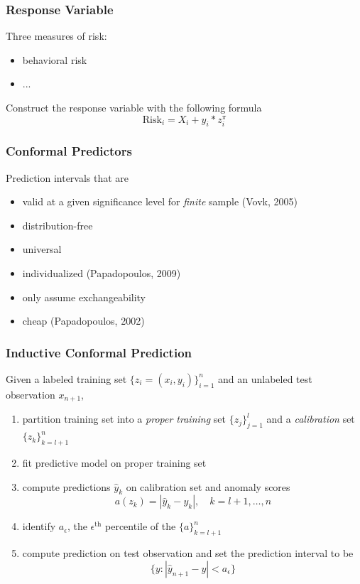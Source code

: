 \documentclass{beamer}
\begin{document}
\begin{frame} \frametitle{Response Variable}

Three measures of risk:
\begin{itemize}
	\item behavioral risk
	\item ...
\end{itemize}

Construct the response variable with the following formula
$$\text{Risk}_i = X_i + y_i * z_i ^ \pi$$

\end{frame}


\begin{frame} \frametitle{Conformal Predictors}

Prediction intervals that are
\begin{itemize}
	\item valid at a given significance level for \textit{finite} sample (Vovk, 2005)
	\item distribution-free
	\item universal
	\item individualized (Papadopoulos, 2009)
	\item only assume exchangeability
	\item cheap (Papadopoulos, 2002)
\end{itemize}
\end{frame}


\begin{frame} \frametitle{Inductive Conformal Prediction}

Given a labeled training set $\{z_i = (x_i, y_i)\}_{i=1}^n$ and an unlabeled test observation $x_{n+1}$,
\begin{enumerate}
	\item partition training set into a \textit{proper training} set $\{z_j\}_{j=1}^l$ and a \textit{calibration} set $\{z_k \}_{k=l+1}^n$
	\item fit predictive model on proper training set
	\item compute predictions $\hat{y}_k$ on calibration set and anomaly scores
	$$a(z_k) = |\hat{y}_k - y_k|, \quad k = l+1, \dots, n$$
	\item identify $a_\epsilon$, the $\epsilon^{\text{th}}$ percentile of the $\{a\}_{k=l+1}^n$
	\item compute prediction on test observation and set the prediction interval to be
	$$\{y: |\hat{y}_{n+1} - y| < a_\epsilon\}$$
	\end{enumerate}
\end{frame}
\end{document}
